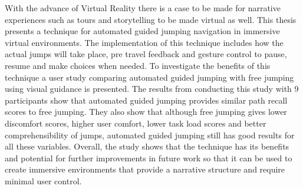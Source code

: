 \label{Abstract}
With the advance of Virtual Reality there is a case to be made for narrative experiences such as tours and storytelling to be made virtual as well. This thesis presents a technique for automated guided jumping navigation in immersive virtual environments. The implementation of this technique includes how the actual jumps will take place, pre travel feedback and gesture control to pause, resume and make choices when needed. To investigate the benefits of this technique a user study comparing automated guided jumping with free jumping using visual guidance is presented. The results from conducting this study with 9 participants show that automated guided jumping provides similar path recall scores to free jumping. They also show that although free jumping gives lower discomfort scores, higher user comfort, lower task load scores and better comprehensibility of jumps, automated guided jumping still has good results for all these variables. Overall, the study shows that the technique has its benefits and potential for further improvements in future work so that it can be used to create immersive environments that provide a narrative structure and require minimal user control.